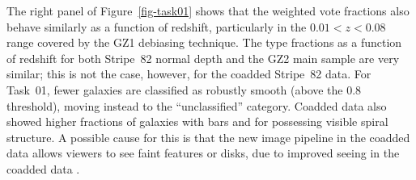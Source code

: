 \documentclass[useAMS,usenatbib]{mn2e}
\begin{document}
The right panel of Figure~\ref{fig-task01} shows that the weighted vote fractions also behave similarly as a function of redshift, particularly in the $0.01<z<0.08$ range covered by the GZ1 debiasing technique. The type fractions as a function of redshift for both Stripe~82 normal depth and the GZ2 main sample are very similar; this is not the case, however, for the coadded Stripe~82 data. For Task~01, fewer galaxies are classified as robustly smooth (above the 0.8 threshold), moving instead to the ``unclassified'' category. Coadded data also showed higher fractions of galaxies with bars and for possessing visible spiral structure. A possible cause for this is that the new image pipeline in the coadded data allows viewers to see faint features or disks, due to improved seeing in the coadded data \citep[from $1.4\arcsec$ to $1.1\arcsec$;][]{ann11}.

\end{document}
